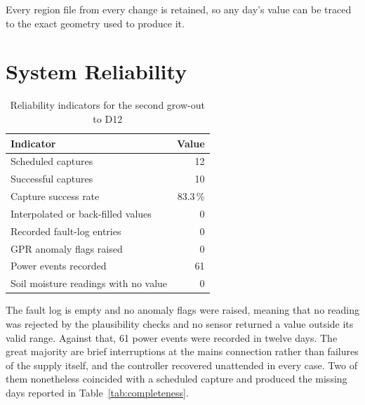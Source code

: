 Every region file from every change is retained, so any day's value can be
traced to the exact geometry used to produce it.

\section{System Reliability}

\begin{table}[ht]
\centering
\caption{Reliability indicators for the second grow-out to D12}
\label{tab:reliability}
\begin{tabular}{lr}
\toprule
\textbf{Indicator} & \textbf{Value} \\
\midrule
Scheduled captures                & 12 \\
Successful captures               & 10 \\
Capture success rate              & 83.3\,\% \\
Interpolated or back-filled values & 0 \\
Recorded fault-log entries        & 0 \\
GPR anomaly flags raised          & 0 \\
Power events recorded             & 61 \\
Soil moisture readings with no value & 0 \\
\bottomrule
\end{tabular}
\end{table}


The fault log is empty and no anomaly flags were raised, meaning that no
reading was rejected by the plausibility checks and no sensor returned a value
outside its valid range. Against that, 61 power events were recorded in twelve
days. The great majority are brief interruptions at the mains connection
rather than failures of the supply itself, and the controller recovered
unattended in every case. Two of them nonetheless coincided with a scheduled
capture and produced the missing days reported in
Table~\ref{tab:completeness}.


